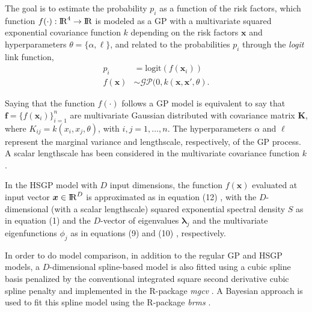 \documentclass[onecolumn,a4paper,11pt]{article}
\begin{document}
\noindent The goal is to estimate the probability $p_i$ as a function of the risk factors, which function $f(\cdot):{\rm I\!R}^{4} \to {\rm I\!R}$ is modeled as a GP with a multivariate squared exponential covariance function $k$ depending on the risk factors $\bm{x}$ and hyperparameters $\theta=\{\alpha,\ell\}$, and related to the probabilities $p_i$ through the {\it logit} link function,
%
\begin{align*} \label{ch5_eq_gpprior_gay}
p_i &= \mathrm{logit}(f(\bm{x}_i)) \nonumber \\
f(\bm{x}) &\sim \mathcal{GP}(0, k(\bm{x},\bm{x}', \theta).
\end{align*}

\noindent Saying that the function $f(\cdot)$ follows a GP model is equivalent to say that $\bm{f}=\{f(\bm{x}_i)\}_{i=1}^n$ are multivariate Gaussian distributed with covariance matrix $\bm{K}$, where $K_{ij}=k(x_i,x_j,\theta)$, with $i,j=1,\dots,n$. The hyperparameters $\alpha$ and $\ell$ represent the marginal variance and lengthscale, respectively, of the GP process. A scalar lengthscale has been considered in the multivariate covariance function $k$.

In the HSGP model with $D$ input dimensions, the function $f(\bm{x})$ evaluated at input vector $\bm{x} \in {\rm I\!R}^D$ is approximated as in equation (12)%
, with the $D$-dimensional (with a scalar lengthscale) squared exponential spectral density $S$ as in equation (1) %
and the $D$-vector of eigenvalues $\bm{\lambda}_j$ and the multivariate eigenfunctions $\phi_j$ as in equations (9) %
and (10)%
, respectively.


In order to do model comparison, in addition to the regular GP and HSGP models, a $D$-dimensional spline-based model is also fitted using a cubic spline basis penalized by the conventional integrated square second derivative cubic spline penalty \citep{wood2017generalized} and implemented in the R-package \textit{mgcv} \citep{wood2011mgcv}. A Bayesian approach is used to fit this spline model using the R-package \textit{brms} \citep{burkner2017brms}.
\end{document}
